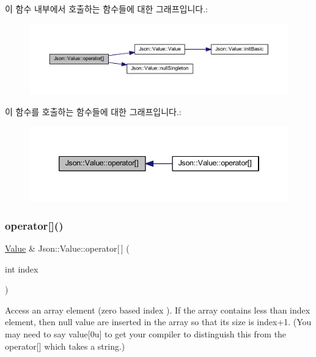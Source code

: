 이 함수 내부에서 호출하는 함수들에 대한 그래프입니다.\+:\nopagebreak
\begin{figure}[H]
\begin{center}
\leavevmode
\includegraphics[width=350pt]{class_json_1_1_value_a7d99f5dba388cdaa152ce6ef933d64ef_cgraph}
\end{center}
\end{figure}
이 함수를 호출하는 함수들에 대한 그래프입니다.\+:\nopagebreak
\begin{figure}[H]
\begin{center}
\leavevmode
\includegraphics[width=346pt]{class_json_1_1_value_a7d99f5dba388cdaa152ce6ef933d64ef_icgraph}
\end{center}
\end{figure}
\mbox{\label{class_json_1_1_value_ac9182982c361e0ab621134d406e5f250}} 
\subsubsection{\texorpdfstring{operator[]()}{operator[]()}\hspace{0.1cm}{\footnotesize\ttfamily [2/9]}}
{\footnotesize\ttfamily \hyperlink{class_json_1_1_value}{Value} \& Json\+::\+Value\+::operator\mbox{[}$\,$\mbox{]} (\begin{DoxyParamCaption}\item[{int}]{index }\end{DoxyParamCaption})}

Access an array element (zero based index ). If the array contains less than index element, then null value are inserted in the array so that its size is index+1. (You may need to say \textquotesingle{}value\mbox{[}0u\mbox{]}\textquotesingle{} to get your compiler to distinguish this from the operator\mbox{[}\mbox{]} which takes a string.) 

